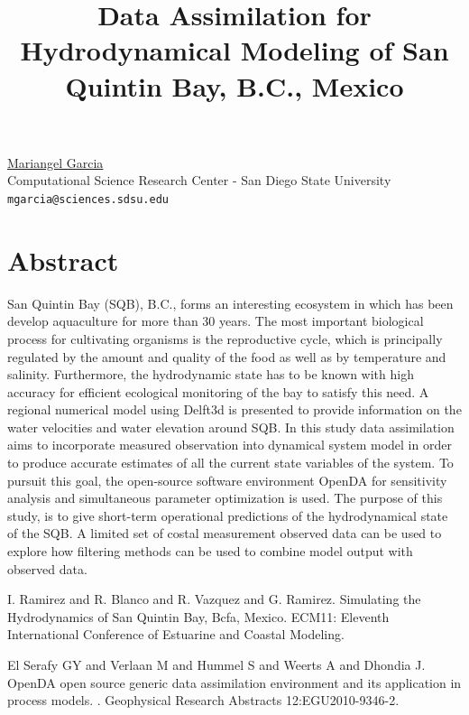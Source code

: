 \documentclass[article, A4, 11pt]{llncs}%
\begin{document}
\title{Data Assimilation for Hydrodynamical Modeling of San Quintin Bay, B.C., Mexico}
 \author{} \institute{}
\maketitle
\begin{center}
{\large \underline{Mariangel Garcia}}\\
Computational Science Research Center - San Diego State University\\
{\tt mgarcia@sciences.sdsu.edu}
\end{center}

\section*{Abstract}
San Quintin Bay (SQB), B.C., forms an interesting ecosystem in which has been develop aquaculture for more than 30 years. The most important biological process for cultivating organisms is the reproductive cycle, which is principally regulated by the amount and quality of the food as well as by temperature and salinity. Furthermore, the hydrodynamic state has to be known with high accuracy for efficient ecological monitoring of the bay to satisfy this need. A regional numerical model using Delft3d is presented to provide information on the water velocities and water elevation around SQB.  In this study data assimilation aims to incorporate measured observation into dynamical system model in order to produce accurate estimates of all the current state variables of the system. To pursuit this goal, the open-source software environment OpenDA for sensitivity analysis and simultaneous parameter optimization is used. The purpose of this study, is to give short-term operational predictions of the hydrodynamical state of the SQB. A limited set of costal measurement observed data can be used to explore how filtering methods can be used to combine model output with observed data.



\begin{thebibliography}{10}
{\sc I. Ramirez and R. Blanco and R. Vazquez and G. Ramirez}. {Simulating the Hydrodynamics of San Quintin Bay, Bcfa, Mexico}. ECM11: Eleventh International Conference of Estuarine and Coastal Modeling.

{\sc El Serafy GY and Verlaan M and Hummel S and Weerts A and Dhondia J}. {OpenDA open source generic data assimilation environment and its application in process models. }. Geophysical Research Abstracts 12:EGU2010-9346-2.
\end{thebibliography} %
\end{document}
